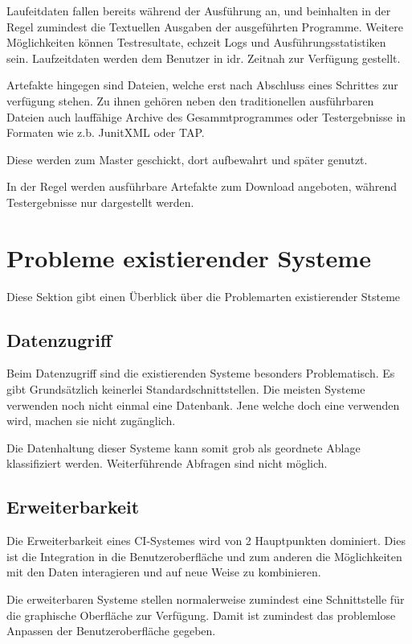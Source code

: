 Laufeitdaten fallen bereits w\"ahrend der Ausf\"uhrung an,
und beinhalten in der Regel zumindest die Textuellen Ausgaben
der ausgef\"uhrten Programme.
Weitere M\"oglichkeiten k\"onnen Testresultate, echzeit Logs und Ausf\"uhrungsstatistiken sein.
Laufzeitdaten werden dem Benutzer in idr. Zeitnah zur Verf\"ugung gestellt.

Artefakte hingegen sind Dateien,
welche erst nach Abschluss eines Schrittes zur verf\"ugung stehen.
Zu ihnen geh\"oren neben den traditionellen ausf\"uhrbaren Dateien
auch lauff\"ahige Archive des Gesammtprogrammes oder Testergebnisse in Formaten wie z.b. JunitXML oder TAP.


Diese werden zum Master geschickt, dort aufbewahrt und sp\"ater genutzt.

In der Regel werden ausf\"uhrbare Artefakte zum Download angeboten,
w\"ahrend Testergebnisse nur dargestellt werden.


\section{Probleme existierender Systeme}

Diese Sektion gibt einen \"Uberblick \"uber die Problemarten existierender Ststeme

\subsection{Datenzugriff}

Beim Datenzugriff sind die existierenden Systeme besonders Problematisch.
Es gibt Grundsätzlich keinerlei Standardschnittstellen.
Die meisten Systeme verwenden noch nicht einmal eine Datenbank.
Jene welche doch eine verwenden wird, machen sie nicht zugänglich.

Die Datenhaltung dieser Systeme kann somit grob als geordnete Ablage klassifiziert werden.
Weiterführende Abfragen sind nicht möglich.

\subsection{Erweiterbarkeit}

Die Erweiterbarkeit eines CI-Systemes wird von 2 Hauptpunkten dominiert.
Dies ist die Integration in die Benutzeroberfl\"ache
und zum anderen die Möglichkeiten mit den Daten interagieren
und auf neue Weise zu kombinieren.

Die erweiterbaren Systeme stellen normalerweise zumindest eine Schnittstelle
für die graphische Oberfläche zur Verfügung.
Damit ist zumindest das problemlose Anpassen der Benutzeroberfläche gegeben.


